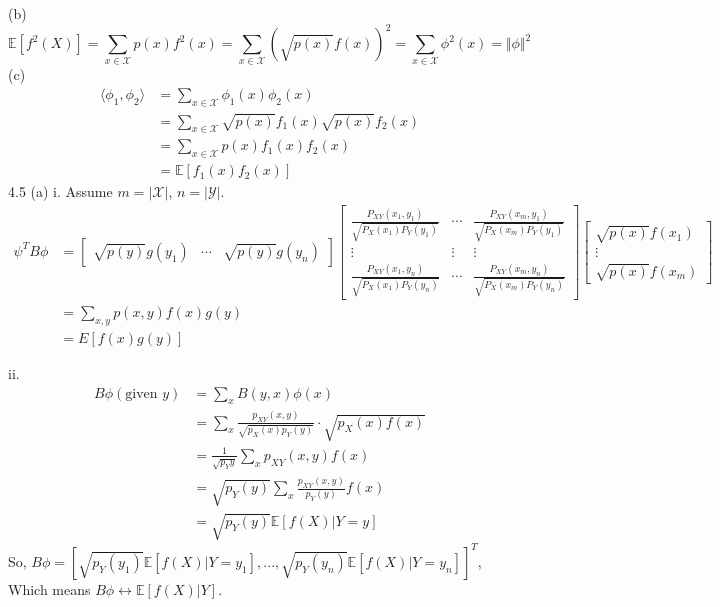 \documentclass[a4paper]{article}
\begin{document}
(b)
$$
\mathbb{E}[f^2(X)] = \sum_{x \in \mathcal{X}} p(x)f^2(x) = \sum_{x \in \mathcal{X}}(\sqrt{p(x)}f(x))^2 = \sum_{x \in \mathcal {X}} \phi^2(x) = \Vert \phi\Vert^2
$$
(c)
$$
\begin{aligned}
\langle\phi_1,\phi_2\rangle &= \sum_{x \in \mathcal{X}} \phi_1(x)\phi_2(x)\\
&=\sum_{x\in \mathcal{X}}\sqrt{p(x)}f_1(x)\sqrt{p(x)}f_2(x)\\
&= \sum_{x \in \mathcal {X}} p(x)f_1(x)f_2(x)\\
&= \mathbb{E}[f_1(x)f_2(x)]
\end{aligned}
$$
$$$$
4.5 (a) i.
Assume $m = \vert  \mathcal{X}\vert$, $n = \vert \mathcal{Y}\vert$.
\begin{equation*}
\begin{aligned}
\psi^T B \phi &= \begin{bmatrix}
\sqrt{p(y)}g(y_1)&\cdots&\sqrt{p(y)}g(y_{ n })\end{bmatrix}
\begin{bmatrix}
\frac{P_{XY}(x_1,y_1)}{\sqrt{P_X(x_1)P_Y(y_1)}}&\cdots&\frac{P_{XY}(x_m,y_1)}{\sqrt{P_X(x_m)P_Y(y_1)}}\\
\vdots &\vdots &\vdots\\
\frac{P_{XY}(x_1,y_n)}{\sqrt{P_X(x_1)P_Y(y_n)}}&\cdots&\frac{P_{XY}(x_m,y_n)}{\sqrt{P_X(x_m)P_Y(y_n)}}
\end{bmatrix}\begin{bmatrix}
\sqrt{p(x)}f(x_1)\\
\vdots\\
\sqrt{p(x)}f(x_m)
\end{bmatrix}\\
&=\sum_{x,y}p(x,y)f(x)g(y)\\
&=E[f(x)g(y)]
\end{aligned}
\end{equation*}

ii.
\begin{equation*}
\begin{aligned}
B\phi(\text{given }y) &= \sum_{x} B(y,x)\phi(x)\\
&= \sum_x \frac{p_{XY}(x,y)}{\sqrt{p_X(x)p_Y(y)}} \cdot \sqrt{p_X(x) f(x)}\\
&=\frac{1}{\sqrt{p_Y{y}}} \sum_x p_{XY}(x,y)f(x)\\
&= \sqrt{p_Y(y)} \sum_x \frac{p_{XY}(x,y)}{p_{Y}(y)}f(x)\\
&= \sqrt{p_Y(y)} \mathbb{E}[f(X)\vert Y = y] 
\end{aligned}
\end{equation*}
So, $B\phi =[\sqrt{p_Y(y_1)}\mathbb{E}[f(X)\vert Y = y_1],...,\sqrt{p_Y(y_n)}\mathbb{E}[f(X)\vert Y = y_n]]^T $, Which means $B\phi \leftrightarrow\mathbb{E}[f(X)\vert Y ]$.
\end{document}
